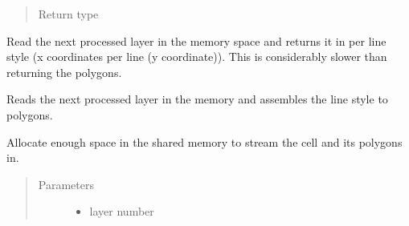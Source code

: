 \documentclass[a4paper,10pt,english]{sphinxmanual}
\begin{document}
\begin{fulllineitems}
\begin{fulllineitems}
\begin{quote}
\begin{description}
\item[{Return type}] \leavevmode
{}%
\begin{footnote}[22]\sphinxAtStartFootnote
{}
%
\end{footnote}

\end{description}\end{quote}

\end{fulllineitems}


\begin{fulllineitems}
\label{\detokenize{drc/drc:kppc.drc.PyCleanerMaster.get_layer}}
Read the next processed layer in the memory space and returns it in per line style (x coordinates per line (y coordinate)). This is considerably slower than returning the polygons.

\end{fulllineitems}


\begin{fulllineitems}
\label{\detokenize{drc/drc:kppc.drc.PyCleanerMaster.polygons}}
Reads the next processed layer in the memory and assembles the line style to polygons.

\end{fulllineitems}


\begin{fulllineitems}
\label{\detokenize{drc/drc:kppc.drc.PyCleanerMaster.set_box}}
Allocate enough space in the shared memory to stream the cell and its polygons in.
\begin{quote}\begin{description}
\item[{Parameters}] \leavevmode\begin{itemize}
\item {} 
 \textendash{} layer number


\end{itemize}
\end{description}
\end{quote}
\end{fulllineitems}
\end{fulllineitems}
\end{document}
